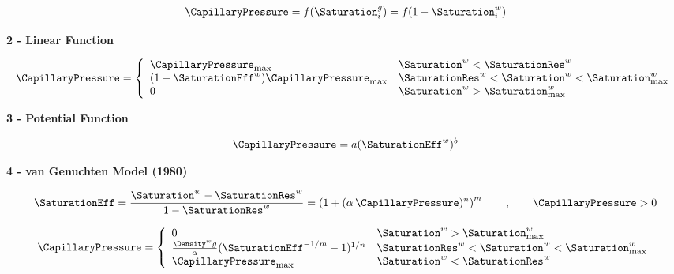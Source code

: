 \begin{eqnarray}
\CapillaryPressure = f(\Saturation^g_i) = f(1-\Saturation^w_i)
\end{eqnarray}


\textbf{2 - Linear Function}

\vspace{5mm}

\begin{eqnarray}
\CapillaryPressure = \left\{
\begin{array}{ll}
{\CapillaryPressure}_{\mbox{\footnotesize max}} & \Saturation^w <
\SaturationRes^w
\\
(1-\SaturationEff^w){\CapillaryPressure}_{\mbox{\footnotesize
max}} & \SaturationRes^w < \Saturation^w <
\Saturation^w_{\mbox{\footnotesize max}}
\\
0                                               & \Saturation^w >
\Saturation^w_{\mbox{\footnotesize max}}
\end{array}
\right.
\end{eqnarray}


\textbf{3 - Potential Function}

\vspace{5mm}

\begin{eqnarray}
\CapillaryPressure = a (\SaturationEff^w)^b
\end{eqnarray}


\textbf{4 - van Genuchten Model (1980)}

\vspace{5mm}

\begin{eqnarray}
\SaturationEff = \frac{\Saturation^w - \SaturationRes^w}{1 -
\SaturationRes^w} = \left( 1 + (\alpha \, \CapillaryPressure)^n
\right)^m \qquad , \qquad \CapillaryPressure > 0
\end{eqnarray}

\begin{eqnarray}
\CapillaryPressure = \left\{
\begin{array}{ll}
0                              & \Saturation^w >
\Saturation^w_{\mbox{\footnotesize max}}
\\
\frac{\Density^w g}{\alpha} (\SaturationEff^{-1/m}-1)^{1/n} &
\SaturationRes^w < \Saturation^w <
\Saturation^w_{\mbox{\footnotesize max}}
\\
{\CapillaryPressure}_{\mbox{\footnotesize max}} & \Saturation^w <
\SaturationRes^w
\end{array}
\right.
\end{eqnarray}


